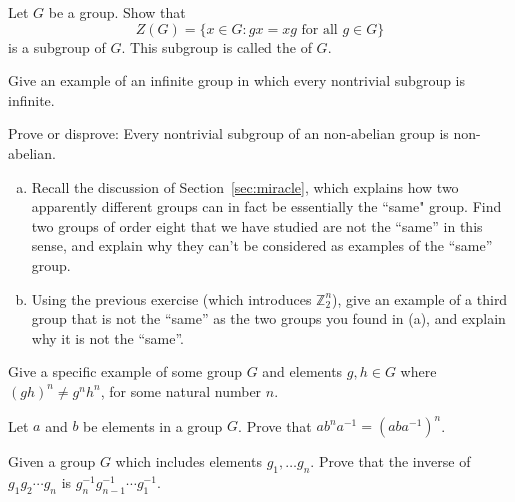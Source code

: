 \begin{exercise}{}
Let $G$ be a group. Show that
\[
Z(G) = \{ x \in G : gx = xg \mbox{ for all $g \in G$}
\}\label{centerofagroup} 
\]
is a subgroup of $G$. This subgroup is called the  of $G$. 
\end{exercise} 
 
 
\begin{exercise}{}
Give an example of an infinite group in which every nontrivial
subgroup is infinite.
\end{exercise}
 
\begin{exercise}{}
Prove or disprove: Every nontrivial subgroup of an non-abelian group is
non-abelian.
\end{exercise}  

\begin{exercise}{}\label{ex:eoc:11}
\begin{enumerate}[(a)]
\item
Recall the discussion of Section~\ref{sec:miracle}, which explains how two apparently different groups can in fact be essentially the ``same" group. Find two groups of order eight that we have studied are not the ``same'' in this sense, and explain why they can't be considered as examples of the ``same'' group.  
\item
Using the previous exercise (which introduces ${\mathbb Z}_2^n$), give an example of a third group that is not the ``same'' as the two groups you found in (a), and explain why it is not the ``same''.
\end{enumerate}
\end{exercise}
 
\begin{exercise}{}
Give a specific example of some group $G$ and elements $g, h \in G$
where $(gh)^n \neq g^nh^n$, for some natural number $n$. 
\end{exercise} 
 

  
\begin{exercise}{}
Let $a$ and $b$ be elements in a group $G$.  Prove that $ab^na^{-1} =
(aba^{-1})^n$. 
\end{exercise}

\begin{exercise}{}\label{ex:eoc:15}
Given a group $G$ which includes elements $g_1,\ldots g_n$. Prove that the inverse of $g _1 g_2 \cdots g_n$ is $g_n^{-1}
g_{n-1}^{-1} \cdots g_1^{-1}$. 
\end{exercise} 
 
